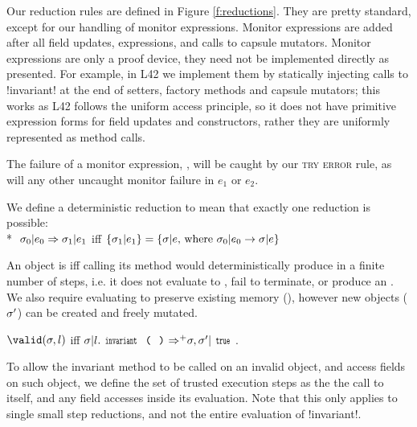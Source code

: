 Our reduction rules are defined in Figure \ref{f:reductions}.
They are pretty standard, except for our handling of monitor expressions. Monitor expressions are added after all field updates, \Q@new@ expressions, and calls to capsule mutators.
Monitor expressions are only a proof device, they need not be implemented directly as presented.
For example, in L42 we implement them by statically injecting calls to \Q!invariant! at the end of setters, factory methods and capsule mutators; this works as L42 follows the uniform access principle, so it does not have primitive expression forms for field updates and constructors, rather they are uniformly represented as method calls.

The failure of a monitor expression, , will be caught by our \textsc{try error} rule, as will any other uncaught monitor failure in $e_1$ or $e_2$.

We define a deterministic reduction to mean that exactly one reduction is possible:\\*
\indent$\ \sigma_0|e_0\Rightarrow \sigma_1|e_1$ iff $\{\sigma_1|e_1\}=\{\sigma|e \text{, where } \sigma_0|e_0\rightarrow \sigma|e\}$

\noindent An object is \valid iff calling its \Q@invariant@ method would
deterministically produce \Q@true@ in a finite number of steps, i.e. it does not evaluate to \Q@false@, fail to terminate, or produce an \error.
We also require evaluating \Q@invariant@ to preserve existing memory (\s), however new objects ($\sigma'$) can be created and freely mutated.

\indent$\valid(\s,l)$ iff $\s | l.\invariant {\Rightarrow^+} \s,\s' | \Kw{true}$.%

\noindent 
To allow the invariant method to be called on an invalid object, and access fields on such object, we define the set of trusted execution steps as the the call to \Q@invariant@ itself, and any field accesses inside its evaluation. Note that this only applies to single small step reductions, and not the entire evaluation of \Q!invariant!.

